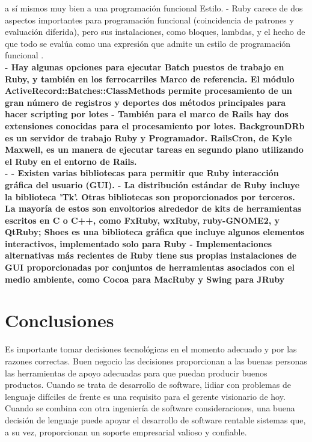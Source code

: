 \documentclass[twoside,twocolumn]{article}
\begin{document}
\begin{itemize}
{a sí mismos muy bien a una programación funcional
Estilo.
- Ruby carece de dos aspectos importantes para
programación funcional (coincidencia de patrones y
evaluación diferida), pero sus instalaciones, como
bloques, lambdas, y el hecho de que todo
se evalúa como una expresión que admite un
estilo de programación funcional
.}
\\ \textbf{-  Hay algunas opciones para ejecutar Batch
puestos de trabajo en Ruby, y también en los ferrocarriles
Marco de referencia. El módulo
ActiveRecord::Batches::ClassMethods permite
procesamiento de un gran número de registros y deportes
dos métodos principales para hacer scripting por lotes
- También para el marco de Rails hay dos
extensiones conocidas para el procesamiento por lotes.
BackgrounDRb es un servidor de trabajo Ruby y
Programador. RailsCron, de Kyle Maxwell, es un
manera de ejecutar tareas en segundo plano utilizando el Ruby
en el entorno de Rails.  }
\\ \textbf{- - Existen varias bibliotecas para permitir que Ruby
interacción gráfica del usuario (GUI).
- La distribución estándar de Ruby incluye
la biblioteca 'Tk'. Otras bibliotecas son
proporcionados por terceros. La mayoría de estos son
envoltorios alrededor de kits de herramientas escritos en C o C++,
como FxRuby, wxRuby, ruby-GNOME2, y
QtRuby; Shoes es una biblioteca gráfica que
incluye algunos elementos interactivos,
implementado solo para Ruby
- Implementaciones alternativas más recientes de
Ruby tiene sus propias instalaciones de GUI proporcionadas por
conjuntos de herramientas asociados con el medio ambiente,
como Cocoa para MacRuby y Swing para JRuby}
\end{itemize}


\section{Conclusiones}
Es importante tomar decisiones tecnológicas en el momento adecuado y por las razones correctas. Buen negocio
las decisiones proporcionan a las buenas personas las herramientas de apoyo adecuadas para que puedan producir buenos productos.
Cuando se trata de desarrollo de software, lidiar con problemas de lenguaje difíciles de frente es una
requisito para el gerente visionario de hoy. Cuando se combina con otra ingeniería de software
consideraciones, una buena decisión de lenguaje puede apoyar el desarrollo de software rentable
sistemas que, a su vez, proporcionan un soporte empresarial valioso y confiable.


\end{document}
